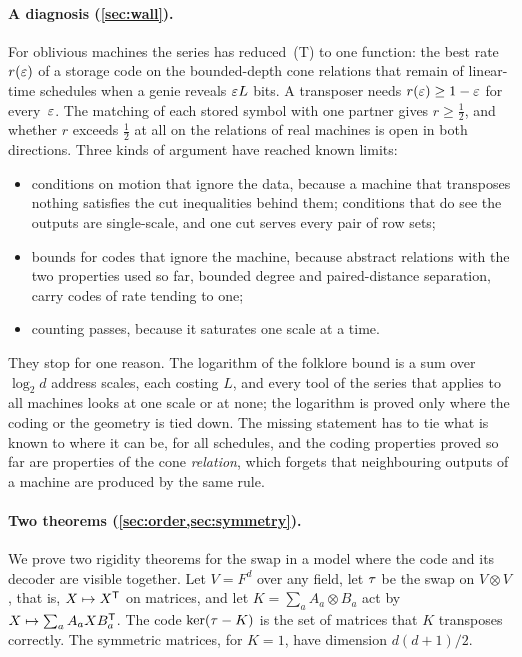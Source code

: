 \paragraph{A diagnosis (\cref{sec:wall}).} For oblivious machines the series has reduced~(T) to one function: the best
rate $r(\varepsilon)$ of a storage code on the bounded-depth cone relations that remain of linear-time schedules when a genie
reveals $\varepsilon L$ bits. A transposer needs $r(\varepsilon)\ge1-\varepsilon$ for every~$\varepsilon$. The matching of each stored symbol with
one partner gives $r\ge\tfrac12$, and whether $r$ exceeds $\tfrac12$ at all on the relations of real machines is open in
both directions. Three kinds of argument have reached known limits:
\begin{itemize}[leftmargin=1.5em]
\item conditions on motion that ignore the data, because a machine that transposes nothing satisfies the cut
inequalities behind them; conditions that do see the outputs are single-scale, and one cut serves every pair of row
sets;
\item bounds for codes that ignore the machine, because abstract relations with the two properties used so far,
bounded degree and paired-distance separation, carry codes of rate tending to one;
\item counting passes, because it saturates one scale at a time.
\end{itemize}
They stop for one reason. The logarithm of the folklore bound is a sum over $\log_2d$ address scales, each costing $L$,
and every tool of the series that applies to all machines looks at one scale or at none; the logarithm is proved only
where the coding or the geometry is tied down. The missing statement has to tie what is known to where it can be, for
all schedules, and the coding properties proved so far are properties of the cone \emph{relation}, which forgets that
neighbouring outputs of a machine are produced by the same rule.

\paragraph{Two theorems (\cref{sec:order,sec:symmetry}).} We prove two rigidity theorems for the swap in a model where
the code and its decoder are visible together. Let $V=F^d$ over any field, let $\tau$ be the swap on $V\otimes V$, that
is, $X\mapsto X^{\mathsf{T}}$ on matrices, and let $K=\sum_aA_a\otimes B_a$ act by $X\mapsto\sum_aA_aXB_a^{\mathsf{T}}$. The code
$\ker(\tau-K)$ is the set of matrices that $K$ transposes correctly. The symmetric matrices, for $K=1$, have dimension
$d(d+1)/2$.

